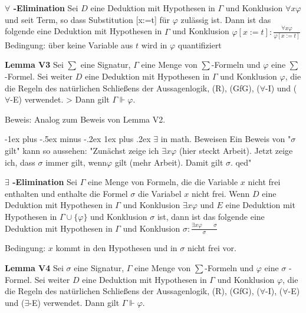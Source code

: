 \documentclass[a4paper]{article}
\makeatletter
\renewcommand{\note}[2]{\begin{noteBox} \textbf{#1} #2 \end{noteBox}}
\renewcommand{\subsubsection}{\@startsection{subsubsection}{3}{0mm}%
                {-1ex plus -.5ex minus -.2ex}%
                {1ex plus .2ex}%
                {\normalfont\small\bfseries}}
\makeatother
\begin{document}
\begin{multicols}{3}
  \note{ $\forall$ -Elimination}{Sei $D$ eine Deduktion mit Hypothesen in $\Gamma$ und Konklusion $\forall x\varphi$ und seit Term, so dass Substitution [x:=t] für $\varphi$ zulässig ist.
    Dann ist das folgende eine Deduktion mit Hypothesen in $\Gamma$ und Konklusion $\varphi[x:=t]:\frac{\forall x\varphi}{\varphi[x:=t]}$
    Bedingung: über keine Variable aus $t$ wird in $\varphi$ quantifiziert}

  \note{Lemma V3}{ Sei $\sum$ eine Signatur, $\Gamma$ eine Menge von $\sum$-Formeln und $\varphi$ eine $\sum$-Formel. Sei weiter $D$ eine Deduktion mit Hypothesen in $\Gamma$ und Konklusion $\varphi$, die die Regeln des natürlichen Schließens der Aussagenlogik, (R), (GfG), ($\forall$-I) und ($\forall$-E) verwendet. > Dann gilt $\Gamma\Vdash\varphi$.}

  Beweis: Analog zum Beweis von Lemma V2.

  \subsubsection{$\exists$ in math. Beweisen}
  Ein Beweis von "$\sigma$ gilt" kann so aussehen:
  "Zunächst zeige ich $\exists x\varphi$ (hier steckt Arbeit). Jetzt zeige ich, dass $\sigma$ immer gilt, wenn$\varphi$ gilt (mehr Arbeit). Damit gilt $\sigma$. qed"

  \note{$\exists$ -Elimination}{Sei $\Gamma$ eine Menge von Formeln, die die Variable $x$ nicht frei enthalten und enthalte die Formel $\sigma$  die Variabel $x$ nicht frei. Wenn $D$ eine Deduktion mit Hypothesen in $\Gamma$ und Konklusion $\exists x\varphi$ und $E$ eine Deduktion mit Hypothesen in $\Gamma\cup\{\varphi\}$ und Konklusion $\sigma$ ist, dann ist das folgende eine Deduktion mit Hypothesen in $\Gamma$ und Konklusion $\sigma:\frac{\exists x\varphi \quad\quad \sigma}{\sigma}$

    Bedingung: $x$ kommt in den Hypothesen und in $\sigma$ nicht frei vor.}

  \note{Lemma V4}{Sei $\sigma$ eine Signatur, $\Gamma$ eine Menge von $\sum$-Formeln und $\varphi$ eine $\sigma$ -Formel.
    Sei weiter $D$ eine Deduktion mit Hypothesen in $\Gamma$ und Konklusion $\varphi$, die die Regeln des natürlichen Schließens der Aussagenlogik, (R), (GfG), ($\forall$-I), ($\forall$-E) und ($\exists$-E) verwendet. Dann gilt $\Gamma\Vdash\varphi$.}


\end{multicols}
\end{document}
